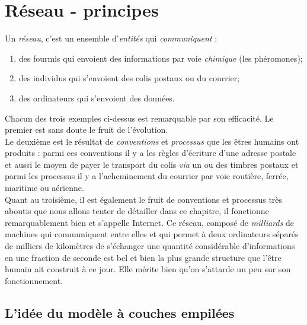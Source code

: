 \documentclass[a4paper,12pt]{book}
\begin{document}
\chapter{Réseau - principes}
Un \textit{réseau}, c'est un ensemble d'\textit{entités} qui \textit{communiquent} :
\begin{enumerate}[--]
	\item 	des fourmis qui envoient des informations par voie \textit{chimique} (les phéromones);
	\item 	des individus qui s'envoient des colis postaux ou du courrier;
	\item 	des ordinateurs qui s'envoient des données.
\end{enumerate}
Chacun des trois exemples ci-dessus est remarquable par son efficacité.
Le premier est sans doute le fruit de l'évolution.\\
Le deuxième est le résultat de \textit{conventions} et \textit{processus} que les êtres humains ont produits : parmi ces conventions il y a les règles d'écriture d'une adresse postale et aussi le moyen de payer le transport du colis \textit{via} un ou des timbres postaux et parmi les processus il y a l'acheminement du courrier par voie routière, ferrée, maritime ou aérienne.\\
Quant au troisième, il est également le fruit de conventions et processus très aboutis que nous allons tenter de détailler dans ce chapitre, il fonctionne remarquablement bien et s'appelle Internet. Ce réseau, composé de \textit{milliards} de machines qui communiquent entre elles et qui permet à deux ordinateurs séparés de milliers de kilomètres de s'échanger une quantité considérable d'informations en une fraction de seconde est bel et bien la plus grande structure que l'être humain ait construit à ce jour. Elle mérite bien qu'on s'attarde un peu sur son fonctionnement.\\

\section*{L'idée du modèle à couches empilées}
\end{document}
